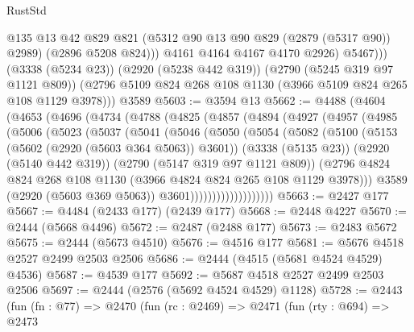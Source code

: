 \begin{lexlean}{RustStd}
\begin{coremodule}
                  @135
                  @13
                  @42
                  @829
                  @821
                  (@5312 @90 @13 @90 @829 (@2879 (@5317 @90)) @2989)
                  (@2896 @5208 @824)))
              @4161
              @4164
              @4167
              @4170
              @2926)
            @5467)))
      (@3338 (@5234 @23))
      (@2920 (@5238 @442 @319))
      (@2790 (@5245 @319 @97 @1121 @809))
      (@2796 @5109 @824 @268 @108 @1130 (@3966 @5109 @824 @265 @108 @1129 @3978)))
    @3589
@5603 := @3594 @13
@5662 := @4488
    (@4604
      (@4653
        (@4696
          (@4734
            (@4788
              (@4825
                (@4857
                  (@4894
                    (@4927
                      (@4957
                        (@4985
                          (@5006
                            (@5023
                              (@5037
                                (@5041
                                  (@5046
                                    (@5050
                                      (@5054
                                        (@5082
                                          (@5100
                                            (@5153 (@5602 (@2920 (@5603 @364 @5063)) @3601))
                                            (@3338 (@5135 @23))
                                            (@2920 (@5140 @442 @319))
                                            (@2790 (@5147 @319 @97 @1121 @809))
                                            (@2796
                                              @4824
                                              @824
                                              @268
                                              @108
                                              @1130
                                              (@3966 @4824 @824 @265 @108 @1129 @3978)))
                                          @3589
                                          (@2920 (@5603 @369 @5063))
                                          @3601)))))))))))))))))))
@5663 := @2427 @177
@5667 := @4484 (@2433 @177) (@2439 @177)
@5668 := @2448 @4227
@5670 := @2444 (@5668 @4496)
@5672 := @2487 (@2488 @177)
@5673 := @2483 @5672
@5675 := @2444 (@5673 @4510)
@5676 := @4516 @177
@5681 := @5676 @4518 @2527 @2499 @2503 @2506
@5686 := @2444 (@4515 (@5681 @4524 @4529) @4536)
@5687 := @4539 @177
@5692 := @5687 @4518 @2527 @2499 @2503 @2506
@5697 := @2444 (@2576 (@5692 @4524 @4529) @1128)
@5728 := @2443
    (fun (fn : @77) =>
    @2470
      (fun (rc : @2469) =>
      @2471
        (fun (rty : @694) =>
        @2473

\end{coremodule}
\end{lexlean}

